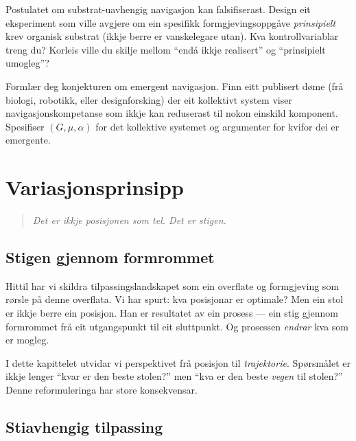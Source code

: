 \begin{exercise}[Nivå 3]\label{ex:6.5}
Postulatet om substrat-uavhengig navigasjon kan falsifiserast.
Design eit eksperiment som ville avgjere om ein spesifikk
formgjevingsoppgåve \emph{prinsipielt} krev organisk substrat
(ikkje berre er vanskelegare utan). Kva kontrollvariablar treng du?
Korleis ville du skilje mellom ``endå ikkje realisert'' og
``prinsipielt umogleg''?
\end{exercise}

\begin{exercise}[Nivå 3]\label{ex:6.6}
Formlær deg konjekturen om emergent navigasjon. Finn eitt
publisert døme (frå biologi, robotikk, eller designforsking) der
eit kollektivt system viser navigasjonskompetanse som ikkje kan
reduserast til nokon einskild komponent. Spesifiser $(G, \mu,
\alpha)$ for det kollektive systemet og argumenter for kvifor dei
er emergente.
\end{exercise}


\chapter{Variasjonsprinsipp}
\label{chap:variasjon}

\begin{quote}
\itshape
Det er ikkje posisjonen som tel. Det er stigen.
\end{quote}

\section{Stigen gjennom formrommet}

Hittil har vi skildra tilpassingslandskapet som ein overflate og
formgjeving som rørsle på denne overflata. Vi har spurt: kva
posisjonar er optimale? Men ein stol er ikkje berre ein posisjon.
Han er resultatet av ein prosess --- ein stig gjennom formrommet
frå eit utgangspunkt til eit sluttpunkt. Og prosessen
\emph{endrar} kva som er mogleg.

I dette kapittelet utvidar vi perspektivet frå posisjon til
\emph{trajektorie}. Spørsmålet er ikkje lenger ``kvar er den
beste stolen?'' men ``kva er den beste \emph{vegen} til
stolen?'' Denne reformuleringa har store konsekvensar.


\section{Stiavhengig tilpassing}

